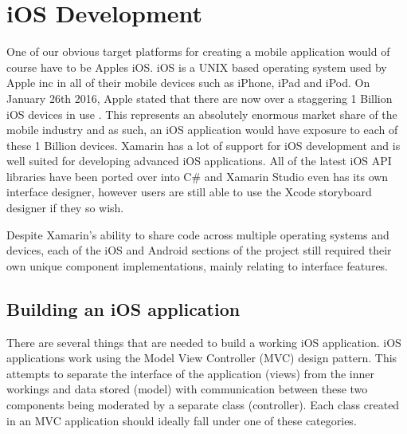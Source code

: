 \documentclass[main.tex]{subfiles}
\begin{document}
\section{iOS Development}
One of our obvious target platforms for creating a mobile application would of course have to be Apples iOS. iOS is a UNIX based operating system used by Apple inc in all of their mobile devices such as iPhone, iPad and iPod. On January 26th 2016, Apple stated that there are now over a staggering 1 Billion iOS devices in use \cite{1billios}. This represents an absolutely enormous market share of the mobile industry and as such, an iOS application would have exposure to each of these 1 Billion devices. Xamarin has a lot of support for iOS development and is well suited for developing advanced iOS applications. All of the latest iOS API libraries have been ported over into C# and Xamarin Studio even has its own interface designer, however users are still able to use the Xcode storyboard designer if they so wish.

Despite Xamarin's ability to share code across multiple operating systems and devices, each of the iOS and Android sections of the project still required their own unique component implementations, mainly relating to interface features.



\subsection{Building an iOS application}

There are several things that are needed to build a working iOS application. iOS applications work using the Model View Controller (MVC) design pattern. This attempts to separate the interface of the application (views) from the inner workings and data stored (model) with communication between these two components being moderated by a separate class (controller). Each class created in an MVC application should ideally fall under one of these categories. 
\end{document}
